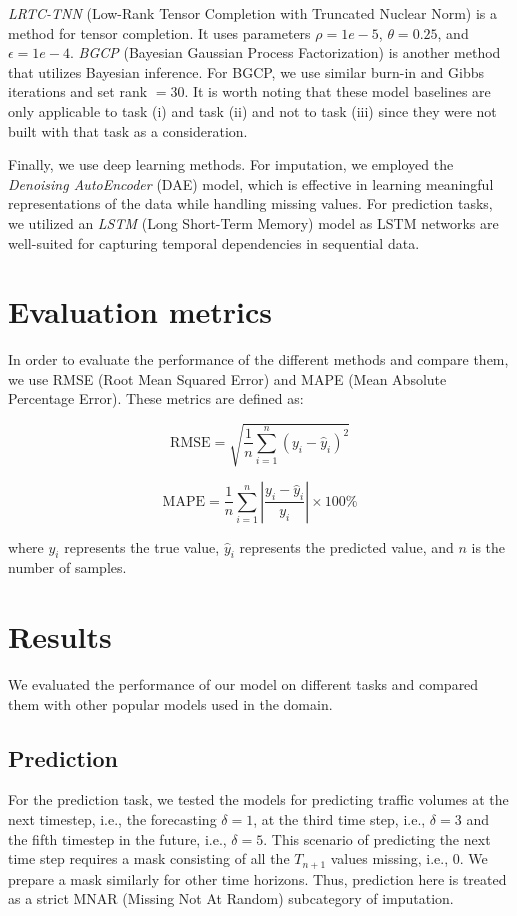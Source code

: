 \textit{LRTC-TNN}\cite{lrtc} (Low-Rank Tensor Completion with Truncated Nuclear Norm) is a method for tensor completion. It uses parameters $\rho = 1e-5$, $\theta = 0.25$, and $\epsilon = 1e-4$. \textit{BGCP} (Bayesian Gaussian Process Factorization) is another method that utilizes Bayesian inference. For BGCP, we use similar burn-in and Gibbs iterations and set rank $= 30$. It is worth noting that these model baselines are only applicable to task (i) and task (ii) and not to task (iii) since they were not built with that task as a consideration.

Finally, we use deep learning methods. For imputation, we employed the \textit{Denoising AutoEncoder} (DAE)\cite{dae} model, which is effective in learning meaningful representations of the data while handling missing values. For prediction tasks, we utilized an \textit{LSTM}\cite{lstm} (Long Short-Term Memory) model as LSTM networks are well-suited for capturing temporal dependencies in sequential data.

\section{Evaluation metrics}

In order to evaluate the performance of the different methods and compare them, we use RMSE (Root Mean Squared Error) and MAPE (Mean Absolute Percentage Error). These metrics are defined as:


\[
\text{RMSE} = \sqrt{\frac{1}{n} \sum_{i=1}^{n} (y_i - \hat{y}_i)^2}
\]

\[
\text{MAPE} = \frac{1}{n} \sum_{i=1}^{n} \left| \frac{y_i - \hat{y}_i}{y_i} \right| \times 100\%
\]

where \( y_i \) represents the true value, \( \hat{y}_i \) represents the predicted value, and \( n \) is the number of samples.

\section{Results}

We evaluated the performance of our model on different tasks and compared them with other popular models used in the domain.

\subsection{Prediction}
For the prediction task, we tested the models for predicting traffic volumes at the next timestep, i.e., the forecasting $\delta = 1$, at the third time step, i.e., $\delta = 3$ and the fifth timestep in the future, i.e., $\delta = 5$. This scenario of predicting the next time step requires a mask consisting of all the $T_{n+1}$ values missing, i.e., 0. We prepare a mask similarly for other time horizons. Thus, prediction here is treated as a strict MNAR (Missing Not At Random) subcategory of imputation.


